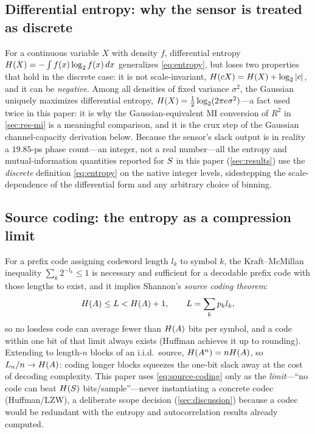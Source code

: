 \subsection{Differential entropy: why the sensor is treated as discrete}
\label{sec:th-diffent}
For a continuous variable $X$ with density $f$, differential entropy
$H\!\left(X\right)=-\int f(x)\log_2 f(x)\,dx$ generalizes \cref{eq:entropy}, but loses two
properties that hold in the discrete case: it is not scale-invariant,
$H\!\left(cX\right)=H\!\left(X\right)+\log_2|c|$, and it can be \emph{negative}. Among all
densities of fixed variance $\sigma^2$, the Gaussian uniquely maximizes
differential entropy, $H\!\left(X\right)=\tfrac12\log_2(2\pi e\sigma^2)$---a fact used
twice in this paper: it is why the Gaussian-equivalent MI conversion of $R^2$ in
\cref{sec:res-mi} is a meaningful comparison, and it is the crux step of the
Gaussian channel-capacity derivation below. Because the sensor's slack output is
in reality a $19.85$-ps phase count---an integer, not a real number---all the
entropy and mutual-information quantities reported for $S$ in this paper
(\cref{sec:results}) use the \emph{discrete} definition \cref{eq:entropy} on the
native integer levels, sidestepping the scale-dependence of the differential
form and any arbitrary choice of binning.

\subsection{Source coding: the entropy as a compression limit}
\label{sec:th-source}
For a prefix code assigning codeword length $l_k$ to symbol $k$, the
Kraft--McMillan inequality $\sum_k 2^{-l_k}\le1$ is necessary and sufficient for
a decodable prefix code with those lengths to exist, and it implies Shannon's
\emph{source coding theorem}:
\begin{equation}
  H\!\left(A\right) \le L < H\!\left(A\right)+1, \qquad L=\sum_k p_k l_k,
  \label{eq:source-coding}
\end{equation}
so no lossless code can average fewer than $H\!\left(A\right)$ bits per symbol, and a code
within one bit of that limit always exists (Huffman achieves it up to rounding).
Extending to length-$n$ blocks of an i.i.d.\ source, $H\!\left(A^n\right)=nH\!\left(A\right)$, so
$L_n/n\to H\!\left(A\right)$: coding longer blocks squeezes the one-bit slack away at the
cost of decoding complexity. This paper uses \cref{eq:source-coding} only as the
\emph{limit}---``no code can beat $H\!\left(S\right)$ bits/sample''---never
instantiating a concrete codec (Huffman/LZW), a deliberate scope decision
(\cref{sec:discussion}) because a codec would be redundant with the entropy and
autocorrelation results already computed.

